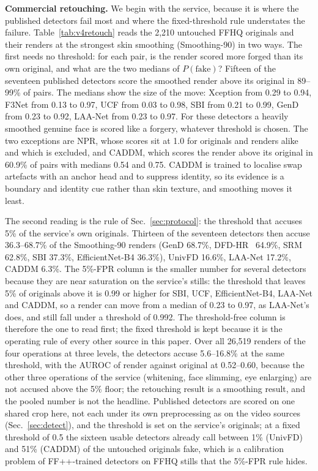 \textbf{Commercial retouching.} We begin with the service, because it is where the published detectors fail most and
where the fixed-threshold rule understates the failure. Table~\ref{tab:v4retouch} reads the 2,210 untouched FFHQ
originals and their renders at the strongest skin smoothing (Smoothing-90) in two ways. The first needs no threshold:
for each pair, is the render scored more forged than its own original, and what are the two medians of
$P(\text{fake})$? Fifteen of the seventeen published detectors score the smoothed render above its original in
89--99\% of pairs. The medians show the size of the move: Xception from 0.29 to 0.94, F3Net from 0.13 to 0.97, UCF from
0.03 to 0.98, SBI from 0.21 to 0.99, GenD~\cite{gend2026} from 0.23 to 0.92, LAA-Net from 0.23 to 0.97. For these
detectors a heavily smoothed genuine face is scored like a forgery, whatever threshold is chosen. The two exceptions are
NPR, whose scores sit at 1.0 for originals and renders alike and which is excluded, and CADDM, which scores the render
above its original in 60.9\% of pairs with medians 0.54 and 0.75. CADDM is trained to localise swap artefacts with an
anchor head and to suppress identity, so its evidence is a boundary and identity cue rather than skin texture, and
smoothing moves it least.

The second reading is the rule of Sec.~\ref{sec:protocol}: the threshold that accuses 5\% of the service's own originals.
Thirteen of the seventeen detectors then accuse 36.3--68.7\% of the Smoothing-90 renders (GenD 68.7\%, DFD-HR~\cite{dfdhr2026}
64.9\%, SRM 62.8\%, SBI 37.3\%, EfficientNet-B4 36.3\%), UnivFD 16.6\%, LAA-Net 17.2\%, CADDM 6.3\%. The 5\%-FPR
column is the smaller number for several detectors because they are near saturation on the service's stills: the
threshold that leaves 5\% of originals above it is 0.99 or higher for SBI, UCF, EfficientNet-B4, LAA-Net and CADDM, so a
render can move from a median of 0.23 to 0.97, as LAA-Net's does, and still fall under a threshold of 0.992. The
threshold-free column is therefore the one to read first; the fixed threshold is kept because it is the operating rule
of every other source in this paper. Over all 26,519 renders of the four operations at three levels, the detectors
accuse 5.6--16.8\% at the same threshold, with the AUROC of render against original at 0.52--0.60, because the other
three operations of the service (whitening, face slimming, eye enlarging) are not accused above the 5\% floor; the
retouching result is a smoothing result, and the pooled number is not the headline. Published detectors are scored on
one shared crop here, not each under its own preprocessing as on the video sources (Sec.~\ref{sec:detect}), and the
threshold is set on the service's originals; at a fixed threshold of 0.5 the sixteen usable detectors already call
between 1\% (UnivFD) and 51\% (CADDM) of the untouched originals fake, which is a calibration problem of FF++-trained
detectors on FFHQ stills that the 5\%-FPR rule hides.

